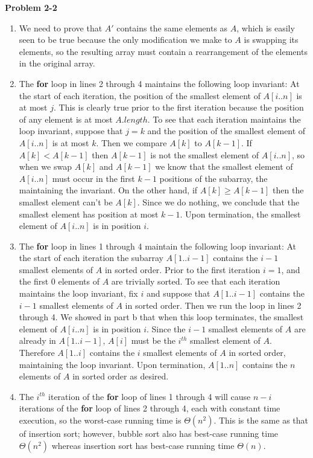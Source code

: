 \documentclass{article}
\begin{document}
\noindent\textbf{Problem 2-2}\\

\begin{enumerate}
\item We need to prove that $A'$ contains the same elements as $A$, which is easily seen to be true because the only modification we make to $A$ is swapping its elements, so the resulting array must contain a rearrangement of the elements in the original array. \\

\item The \textbf{for} loop in lines 2 through 4 maintains the following loop invariant: At the start of each iteration, the position of the smallest element of $A[i..n]$ is at most $j$.  This is clearly true prior to the first iteration because the position of any element is at most $A.length$.  To see that each iteration maintains the loop invariant, suppose that $j=k$ and the position of the smallest element of $A[i..n]$ is at most $k$.  Then we compare $A[k]$ to $A[k-1]$.  If $A[k] < A[k-1]$ then $A[k-1]$ is not the smallest element of $A[i..n]$, so when we swap $A[k]$ and $A[k-1]$ we know that the smallest element of $A[i..n]$ must occur in the first $k-1$ positions of the subarray, the maintaining the invariant.  On the other hand, if $A[k] \geq A[k-1]$ then the smallest element can't be $A[k]$.  Since we do nothing, we conclude that the smallest element has position at most $k-1$.  Upon termination, the smallest element of $A[i..n]$ is in position $i$.  \\

\item The \textbf{for} loop in lines 1 through 4 maintain the following loop invariant:  At the start of each iteration the subarray $A[1..i-1]$ contains the $i-1$ smallest elements of $A$ in sorted order.  Prior to the first iteration $i=1$, and the first 0 elements of $A$ are trivially sorted.  To see that each iteration maintains the loop invariant, fix $i$ and suppose that $A[1..i-1]$ contains the $i-1$ smallest elements of $A$ in sorted order.  Then we run the loop in lines 2 through 4.  We showed in part b that when this loop terminates, the smallest element of $A[i..n]$ is in position $i$.  Since the $i-1$ smallest elements of $A$ are already in $A[1..i-1]$, $A[i]$ must be the $i^{th}$ smallest element of $A$.  Therefore $A[1..i]$ contains the $i$ smallest elements of $A$ in sorted order, maintaining the loop invariant.  Upon termination, $A[1..n]$ contains the $n$ elements of $A$ in sorted order as desired. \\

\item The $i^{th}$ iteration of the \textbf{for} loop of lines 1 through 4 will cause $n-i$ iterations of the \textbf{for} loop of lines 2 through 4, each with constant time execution, so the worst-case running time is $\Theta(n^2)$.  This is the same as that of insertion sort; however, bubble sort also has best-case running time $\Theta(n^2)$ whereas insertion sort has best-case running time $\Theta(n)$. \\

\end{enumerate}
\end{document}
